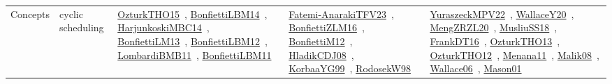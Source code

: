 {\begin{longtable}{lp{3cm}>{\raggedright\arraybackslash}p{6cm}>{\raggedright\arraybackslash}p{6cm}>{\raggedright\arraybackslash}p{8cm}}
Concepts & cyclic scheduling & \href{../works/OzturkTHO15.pdf}{OzturkTHO15}~\cite{OzturkTHO15}, \href{../works/BonfiettiLBM14.pdf}{BonfiettiLBM14}~\cite{BonfiettiLBM14}, \href{../works/HarjunkoskiMBC14.pdf}{HarjunkoskiMBC14}~\cite{HarjunkoskiMBC14}, \href{../works/BonfiettiLM13.pdf}{BonfiettiLM13}~\cite{BonfiettiLM13}, \href{../works/BonfiettiLBM12.pdf}{BonfiettiLBM12}~\cite{BonfiettiLBM12}, \href{../works/LombardiBMB11.pdf}{LombardiBMB11}~\cite{LombardiBMB11}, \href{../works/BonfiettiLBM11.pdf}{BonfiettiLBM11}~\cite{BonfiettiLBM11} & \href{../works/Fatemi-AnarakiTFV23.pdf}{Fatemi-AnarakiTFV23}~\cite{Fatemi-AnarakiTFV23}, \href{../works/BonfiettiZLM16.pdf}{BonfiettiZLM16}~\cite{BonfiettiZLM16}, \href{../works/BonfiettiM12.pdf}{BonfiettiM12}~\cite{BonfiettiM12}, \href{../works/HladikCDJ08.pdf}{HladikCDJ08}~\cite{HladikCDJ08}, \href{../works/KorbaaYG99.pdf}{KorbaaYG99}~\cite{KorbaaYG99}, \href{../works/RodosekW98.pdf}{RodosekW98}~\cite{RodosekW98} & \href{../works/YuraszeckMPV22.pdf}{YuraszeckMPV22}~\cite{YuraszeckMPV22}, \href{../works/WallaceY20.pdf}{WallaceY20}~\cite{WallaceY20}, \href{../works/MengZRZL20.pdf}{MengZRZL20}~\cite{MengZRZL20}, \href{../works/MusliuSS18.pdf}{MusliuSS18}~\cite{MusliuSS18}, \href{../works/FrankDT16.pdf}{FrankDT16}~\cite{FrankDT16}, \href{../works/OzturkTHO13.pdf}{OzturkTHO13}~\cite{OzturkTHO13}, \href{../works/OzturkTHO12.pdf}{OzturkTHO12}~\cite{OzturkTHO12}, \href{../works/Menana11.pdf}{Menana11}~\cite{Menana11}, \href{../works/Malik08.pdf}{Malik08}~\cite{Malik08}, \href{../works/Wallace06.pdf}{Wallace06}~\cite{Wallace06}, \href{../works/Mason01.pdf}{Mason01}~\cite{Mason01}\\

\end{longtable}}
